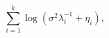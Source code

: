 \documentclass{amsart}
\numberwithin{equation}{section}
\providecommand{\DIFaddbegin}{} %
\providecommand{\DIFaddend}{} %
\providecommand{\DIFdelbegin}{} %
\providecommand{\DIFdelend}{} %
\begin{document}
\DIFdelbegin %

\DIFdelend \DIFaddbegin \begin{equation}\label{eq:true target}
  \sum_{i=1}^{k}\log (\sigma^2 \lambda_i^{-1} + \eta_i),
\end{equation}
\DIFaddend 

\DIFdelbegin %

\end{document}
